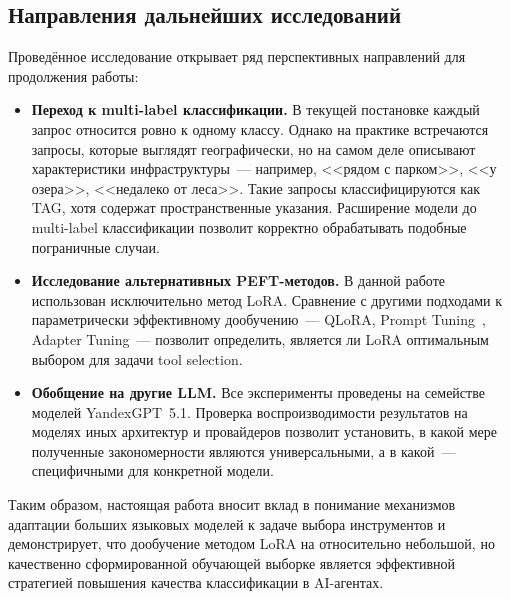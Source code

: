 \subsection{Направления дальнейших исследований}

Проведённое исследование открывает ряд перспективных направлений для продолжения работы:
\begin{itemize}
    \item \textbf{Переход к multi-label классификации.} В текущей постановке каждый запрос относится ровно к одному классу. Однако на практике встречаются запросы, которые выглядят географически, но на самом деле описывают характеристики инфраструктуры~--- например, <<рядом с парком>>, <<у озера>>, <<недалеко от леса>>. Такие запросы классифицируются как TAG, хотя содержат пространственные указания. Расширение модели до multi-label классификации позволит корректно обрабатывать подобные пограничные случаи.

    \item \textbf{Исследование альтернативных PEFT-методов.} В данной работе использован исключительно метод LoRA. Сравнение с другими подходами к параметрически эффективному дообучению~--- QLoRA, Prompt Tuning~\cite{lester2021power}, Adapter Tuning~--- позволит определить, является ли LoRA оптимальным выбором для задачи tool selection.

    \item \textbf{Обобщение на другие LLM.} Все эксперименты проведены на семействе моделей YandexGPT~5.1. Проверка воспроизводимости результатов на моделях иных архитектур и провайдеров позволит установить, в какой мере полученные закономерности являются универсальными, а в какой~--- специфичными для конкретной модели.
\end{itemize}

Таким образом, настоящая работа вносит вклад в понимание механизмов адаптации больших языковых моделей к задаче выбора инструментов и демонстрирует, что дообучение методом LoRA на относительно небольшой, но качественно сформированной обучающей выборке является эффективной стратегией повышения качества классификации в AI-агентах.

